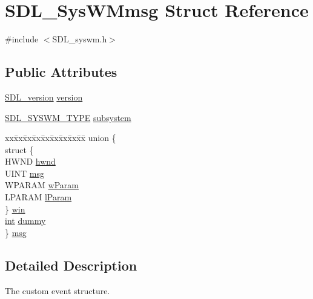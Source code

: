 \hypertarget{struct_s_d_l___sys_w_mmsg}{}\section{S\+D\+L\+\_\+\+Sys\+W\+Mmsg Struct Reference}
\label{struct_s_d_l___sys_w_mmsg}


{\ttfamily \#include $<$S\+D\+L\+\_\+syswm.\+h$>$}

\subsection*{Public Attributes}
\begin{DoxyCompactItemize}
\item 
\hyperlink{struct_s_d_l__version}{S\+D\+L\+\_\+version} \hyperlink{struct_s_d_l___sys_w_mmsg_a95f9aae58d18ee8fac556416b322a5fb}{version}
\item 
\hyperlink{_s_d_l__syswm_8h_a064c26598287280fff2a00d6758ac4f7}{S\+D\+L\+\_\+\+S\+Y\+S\+W\+M\+\_\+\+T\+Y\+PE} \hyperlink{struct_s_d_l___sys_w_mmsg_a7c3900af5ea797f1318fc77ee0ecd11b}{subsystem}
\item 
\begin{tabbing}
xx\=xx\=xx\=xx\=xx\=xx\=xx\=xx\=xx\=\kill
union \{\\
\>struct \{\\
\>\>HWND \hyperlink{struct_s_d_l___sys_w_mmsg_a55cf9583b5eddfe60a5c9851f9cce457}{hwnd}\\
\>\>UINT \hyperlink{struct_s_d_l___sys_w_mmsg_a74894ed060d5508ab06aac584154d61e}{msg}\\
\>\>WPARAM \hyperlink{struct_s_d_l___sys_w_mmsg_a7463730478d90ebc031d83098f3f74fc}{wParam}\\
\>\>LPARAM \hyperlink{struct_s_d_l___sys_w_mmsg_a24c1e4c3cb8d9781d34e5d99df66ac36}{lParam}\\
\>\} \hyperlink{struct_s_d_l___sys_w_mmsg_a4a2c604644a582e72fa86bca36b1b808}{win}\\
\>\hyperlink{_s_d_l__thread_8h_a6a64f9be4433e4de6e2f2f548cf3c08e}{int} \hyperlink{struct_s_d_l___sys_w_mmsg_a8faf13f90f2477157b42b631308cd900}{dummy}\\
\} \hyperlink{struct_s_d_l___sys_w_mmsg_a8890abd547a386afa3a822f15568c162}{msg}\\

\end{tabbing}\end{DoxyCompactItemize}


\subsection{Detailed Description}
The custom event structure. 

